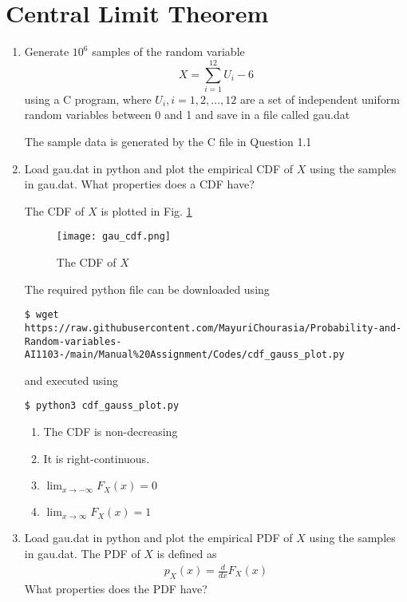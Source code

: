 \documentclass[journal,12pt,twocolumn]{IEEEtran}
\renewcommand\thesection{\arabic{section}}
\begin{document}
\section{Central Limit Theorem}
%
\begin{enumerate}[label=\thesection.\arabic*
,ref=\thesection.\theenumi]

%
\item
Generate $10^6$ samples of the random variable
%
\begin{equation}
X = \sum_{i=1}^{12}U_i -6
\end{equation}
%
using a C program, where $U_i, i = 1,2,\dots, 12$ are  a set of independent uniform random variables between 0 and 1
and save in a file called gau.dat

\solution
The sample data is generated by the C file in Question 1.1
%
\item
Load gau.dat in python and plot the empirical CDF of $X$ using the samples in gau.dat. What properties does a CDF have?

\solution The CDF of $X$ is plotted in Fig. \ref{fig:gauss_cdf}
\begin{figure}
\centering
\texttt{[image: gau\_cdf.png]}
\caption{The CDF of $X$}
\label{fig:gauss_cdf}
\end{figure}
The required python file can be downloaded using
\begin{lstlisting}
$ wget https://raw.githubusercontent.com/MayuriChourasia/Probability-and-Random-variables-AI1103-/main/Manual%20Assignment/Codes/cdf_gauss_plot.py
\end{lstlisting}
and executed using
\begin{lstlisting}
$ python3 cdf_gauss_plot.py
\end{lstlisting}
		\begin{enumerate}
			\item The CDF is non-decreasing
			\item It is right-continuous.
			\item $\lim_{x \to -\infty}F_X(x) = 0$
			\item $\lim_{x \to \infty}F_X(x) = 1$
		\end{enumerate}
\item
Load gau.dat in python and plot the empirical PDF of $X$ using the samples in gau.dat. The PDF of $X$ is defined as
\begin{align}
p_{X}(x) = \frac{d}{dx}F_{X}(x)
\end{align}
What properties does the PDF have?


\end{enumerate}
\end{document}

